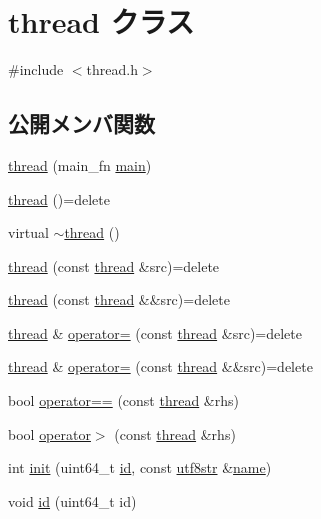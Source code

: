 \hypertarget{classthread}{}\section{thread クラス}
\label{classthread}


{\ttfamily \#include $<$thread.\+h$>$}

\subsection*{公開メンバ関数}
\begin{DoxyCompactItemize}
\item 
\hyperlink{classthread_a1db10940bc1734720d5a562d046b2d41}{thread} (main\+\_\+fn \hyperlink{classthread_aa4a8c5526714238ea8890badce737c08}{main})
\item 
\hyperlink{classthread_a210d87437e34573c32fc8d3f93963bfe}{thread} ()=delete
\item 
virtual \hyperlink{classthread_a117e0892c1d1a90bece03424311676f6}{$\sim$thread} ()
\item 
\hyperlink{classthread_a2debe550e8c36b7c7bafde6861527b6a}{thread} (const \hyperlink{classthread}{thread} \&src)=delete
\item 
\hyperlink{classthread_af2d2b9d1eb276e3d8911694c84cb5f33}{thread} (const \hyperlink{classthread}{thread} \&\&src)=delete
\item 
\hyperlink{classthread}{thread} \& \hyperlink{classthread_a4d7ef0a71785e85bbed76e1a983e41c0}{operator=} (const \hyperlink{classthread}{thread} \&src)=delete
\item 
\hyperlink{classthread}{thread} \& \hyperlink{classthread_aa248d01f65405fe1f03c1526c54d038f}{operator=} (const \hyperlink{classthread}{thread} \&\&src)=delete
\item 
bool \hyperlink{classthread_accfc6460fe7c41635f41d9ad56554eb5}{operator==} (const \hyperlink{classthread}{thread} \&rhs)
\item 
bool \hyperlink{classthread_a8ac74ad7dd695e6c9b46a17ade8a4c12}{operator$>$} (const \hyperlink{classthread}{thread} \&rhs)
\item 
int \hyperlink{classthread_a615945e7f24c83b235a8f4ac166ad70e}{init} (uint64\+\_\+t \hyperlink{classthread_a72727217c70fb64523bf4d367eae1761}{id}, const \hyperlink{classutf8str}{utf8str} \&\hyperlink{classthread_a1edac2ded94641cdef9dacb04efb5c85}{name})
\item 
void \hyperlink{classthread_a72727217c70fb64523bf4d367eae1761}{id} (uint64\+\_\+t id)
\item 

\end{DoxyCompactItemize}

